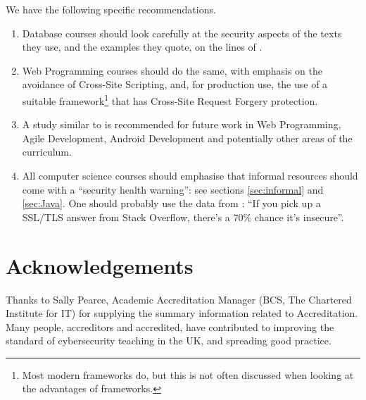 \documentclass[conference]{IEEEtran}
\begin{document}
We have the following specific recommendations.
\begin{enumerate}
\item Database courses should look carefully at the security aspects of the texts they use, and the examples they quote, on the lines of \cite{Drop2019}.
\item Web Programming courses should  do the same, with emphasis on the avoidance of Cross-Site Scripting, and, for production use, the use of a suitable framework\footnote{Most modern frameworks do, but this is not often discussed when looking at the advantages of frameworks.} that has Cross-Site Request Forgery protection. 
\item A study similar to \cite{Drop2019} is recommended for future work in Web Programming, Agile Development, Android Development and potentially other areas of the curriculum.
\item All computer science courses should emphasise that informal resources should come with a ``security health warning'': see sections \ref{sec:informal} and \ref{sec:Java}. One should probably use the data from \cite{Chenetal2019a}: ``If you pick up a SSL/TLS answer from Stack Overflow, there's a 70\% chance it's insecure''.
\end{enumerate}

\section*{Acknowledgements}
Thanks to Sally Pearce, Academic Accreditation Manager (BCS, The Chartered Institute for IT) for supplying the summary information related to Accreditation. Many people, accreditors and accredited, have contributed to improving the standard of cybersecurity teaching in the UK, and spreading good practice.



 
\end{document}
